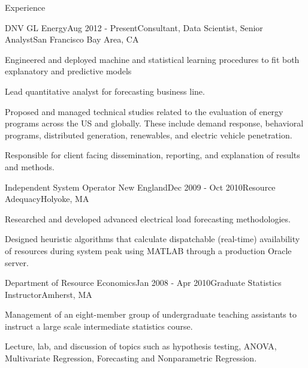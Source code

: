\documentclass{resume} %
\begin{document}

	\begin{rSection}{Experience}

	\begin{rSubsection}{DNV GL Energy}{Aug 2012 - Present}{Consultant, Data Scientist, Senior Analyst}{San Francisco Bay Area, CA}
	\item Engineered and deployed machine and statistical learning procedures to fit both explanatory and predictive models
	\item Lead quantitative analyst for forecasting business line.
	\item Proposed and managed technical studies related to the evaluation of energy programs across the US and globally. These include demand response, behavioral programs, distributed generation, renewables, and electric vehicle  penetration. 
	\item Responsible for client facing dissemination, reporting, and explanation of results and methods. 
	
	\end{rSubsection}


	\begin{rSubsection}{Independent System Operator New England}{Dec 2009 - Oct 2010}{Resource Adequacy}{Holyoke, MA}
	\item Researched and developed advanced electrical load forecasting methodologies.
	\item Designed heuristic algorithms that calculate dispatchable (real-time) availability of resources during system peak using MATLAB through a production Oracle server.
	\end{rSubsection}


	\begin{rSubsection}{Department of Resource Economics}{Jan 2008 - Apr 2010}{Graduate Statistics Instructor}{Amherst, MA}
	\item Management of an eight-member group of undergraduate teaching assistants to instruct a large scale intermediate statistics course.
  \item Lecture, lab, and discussion of topics such as hypothesis testing, ANOVA, Multivariate Regression, Forecasting and Nonparametric Regression.
	\end{rSubsection}

	\end{rSection}
	
\end{document}
